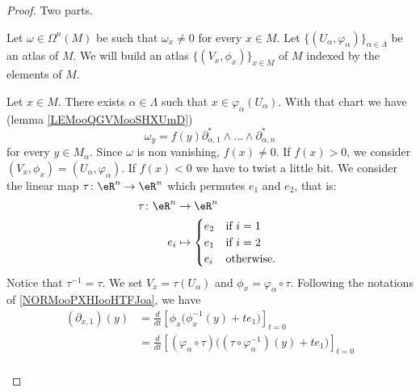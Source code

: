 \begin{proof}
	Two parts.
	\begin{subproof}
		\spitem[\( \Leftarrow\)]
		Let \( \omega\in\Omega^n(M)\) be such that \( \omega_x\neq 0\) for every \( x\in M\). Let \( \{ (U_{\alpha},\varphi_{\alpha}) \}_{\alpha\in \Lambda}\) be an atlas of \( M\). We will build an atlas \( \{ (V_x,\phi_x) \}_{x\in M}\) of \( M\) indexed by the elements of \( M\).

		Let \( x\in M\). There exists \( \alpha\in \Lambda\) such that \( x\in \varphi_{\alpha}(U_{\alpha})\). With that chart we have (lemma \ref{LEMooQGVMooSHXUmD})
		\begin{equation}
			\omega_y=f(y)\partial^*_{\alpha, 1}\wedge\ldots \wedge\partial^*_{\alpha,n}
		\end{equation}
		for every \( y\in M_{\alpha}\). Since \( \omega\) is non vanishing, \( f(x)\neq 0\). If \( f(x)>0\), we consider \( (V_x,\phi_x)=(U_{\alpha}, \varphi_{\alpha})\). If \( f(x)<0\) we have to twist a little bit. We consider the linear map \(\tau \colon \eR^n\to \eR^n  \) which permutes \( e_1\) and \( e_2\), that is:
		\begin{equation}
			\begin{aligned}
				\tau\colon \eR^n & \to \eR^n                        \\
				e_i              & \mapsto \begin{cases}
					                           e_2 & \text{if } i=1     \\
					                           e_1 & \text{if }i=2      \\
					                           e_i & \text{otherwise. }
				                           \end{cases}
			\end{aligned}
		\end{equation}
		Notice that \( \tau^{-1}=\tau\). We set \( V_x=\tau(U_{\alpha})\) and \( \phi_x=\varphi_{\alpha}\circ\tau\). Following the notations of \ref{NORMooPXHIooHTFJoa}, we have
		\begin{subequations}
			\begin{align}
				(\partial_{x,1})(y) & =\frac{d}{dt} \left[ \phi_x\big( \phi_x^{-1}(y)+te_1 \big)  \right]_{t=0}                                            \\
				                    & =\frac{d}{dt} \left[ (\varphi_{\alpha}\circ \tau)\big( (\tau\circ\varphi_{\alpha}^{-1})(y)+te_1 \big)  \right]_{t=0} \\

\end{align}
\end{subequations}
\end{subproof}
\end{proof}
